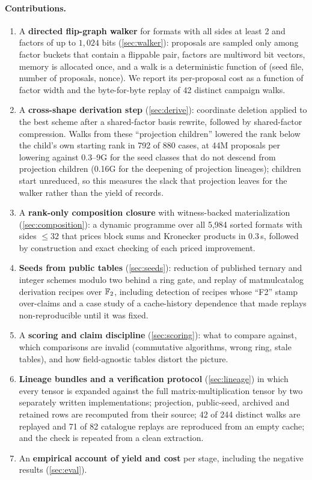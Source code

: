 \paragraph{Contributions.}
\begin{enumerate}
\item A \textbf{directed flip-graph walker} for formats with all sides at least 2 and factors of up to $1{,}024$ bits
(\cref{sec:walker}): proposals are sampled only among factor buckets that contain a flippable pair,
factors are multiword bit vectors, memory is allocated once, and a walk is a deterministic function of
(seed file, number of proposals, nonce). We report its per-proposal cost as a function of factor width
and the byte-for-byte replay of 42 distinct campaign walks.
\item A \textbf{cross-shape derivation step} (\cref{sec:derive}): coordinate deletion applied to the best
scheme after a shared-factor basis rewrite, followed by shared-factor compression. Walks from these
``projection children'' lowered the rank below the child's own starting rank in 792 of 880 cases, at 44M proposals per
lowering against 0.3--9G for the seed classes that do not descend from projection children (0.16G for the deepening of projection lineages); children start unreduced, so this measures the slack that projection
leaves for the walker rather than the yield of records.
\item A \textbf{rank-only composition closure} with witness-backed materialization (\cref{sec:composition}):
a dynamic programme over all 5{,}984 sorted formats with sides $\le32$ that prices block sums and Kronecker products in
0.3\,s, followed by construction and exact checking of each priced improvement.
\item \textbf{Seeds from public tables} (\cref{sec:seeds}): reduction of published ternary and integer schemes
modulo two behind a ring gate, and replay of matmulcatalog derivation recipes over ${\mathbb{F}_2}$, including detection of recipes whose
``F2'' stamp over-claims and a case study of a cache-history dependence that made replays
non-reproducible until it was fixed.
\item A \textbf{scoring and claim discipline} (\cref{sec:scoring}): what to compare against, which comparisons are
invalid (commutative algorithms, wrong ring, stale tables), and how field-agnostic tables distort the picture.
\item \textbf{Lineage bundles and a verification protocol} (\cref{sec:lineage}) in which every tensor is expanded against
the full matrix-multiplication tensor by two separately written implementations; projection, public-seed, archived and retained rows
are recomputed from their source; 42 of 244 distinct walks are replayed and 71 of 82 catalogue replays are reproduced from an empty cache;
and the check is repeated from a clean extraction.
\item An \textbf{empirical account of yield and cost} per stage, including the negative results (\cref{sec:eval}).
\end{enumerate}

